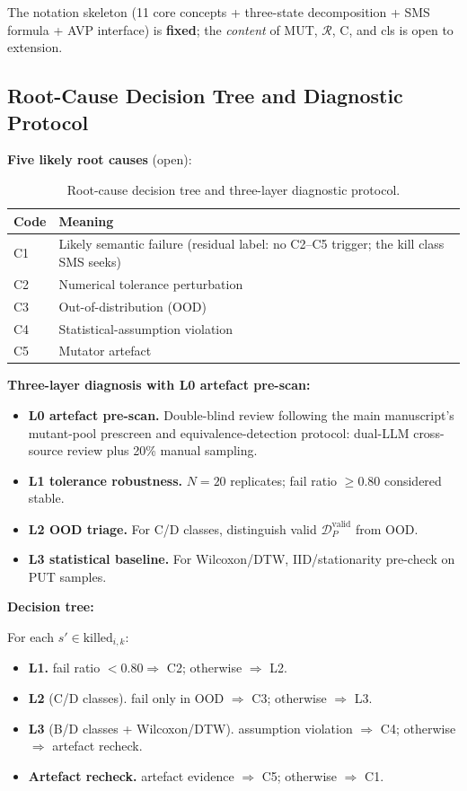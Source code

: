 \documentclass[manuscript,screen,review]{acmart}
\begin{document}
The notation skeleton (11 core concepts + three-state decomposition +
SMS formula + AVP interface) is \textbf{fixed}; the \emph{content} of
MUT, $\mathcal{R}$, C, and cls is open to extension.

\subsection{Root-Cause Decision Tree and Diagnostic Protocol}\label{a.2-lrca-decision-tree-and-three-layer-diagnostic-protocol}

\textbf{Five likely root causes} (open):

{%
\begin{longtable}[]{@{}ll@{}}
\caption{Root-cause decision tree and three-layer diagnostic protocol.}\label{tab:p2-15}\\
\toprule\noalign{}
Code & Meaning \\
\midrule\noalign{}
\endfirsthead
\endhead
\bottomrule\noalign{}
\endlastfoot
C1 & Likely semantic failure (residual label: no C2--C5 trigger; the
kill class SMS seeks) \\
C2 & Numerical tolerance perturbation \\
C3 & Out-of-distribution (OOD) \\
C4 & Statistical-assumption violation \\
C5 & Mutator artefact \\
\end{longtable}
}

\textbf{Three-layer diagnosis with L0 artefact pre-scan:}

\begin{itemize}
\item \textbf{L0 artefact pre-scan.} Double-blind review following the main manuscript's mutant-pool prescreen and equivalence-detection protocol: dual-LLM cross-source review plus 20\% manual sampling.
\item \textbf{L1 tolerance robustness.} $N = 20$ replicates; fail ratio $\geq 0.80$ considered stable.
\item \textbf{L2 OOD triage.} For C/D classes, distinguish valid $\mathcal{D}_P^{\text{valid}}$ from OOD.
\item \textbf{L3 statistical baseline.} For Wilcoxon/DTW, IID/stationarity pre-check on PUT samples.
\end{itemize}

\textbf{Decision tree:}

For each $s' \in \mathrm{killed}_{i,k}$:
\begin{itemize}
\item \textbf{L1.} fail ratio $< 0.80 \Rightarrow$ C2; otherwise $\Rightarrow$ L2.
\item \textbf{L2} (C/D classes). fail only in OOD $\Rightarrow$ C3; otherwise $\Rightarrow$ L3.
\item \textbf{L3} (B/D classes + Wilcoxon/DTW). assumption violation $\Rightarrow$ C4; otherwise $\Rightarrow$ artefact recheck.
\item \textbf{Artefact recheck.} artefact evidence $\Rightarrow$ C5; otherwise $\Rightarrow$ C1.
\end{itemize}
\end{document}
